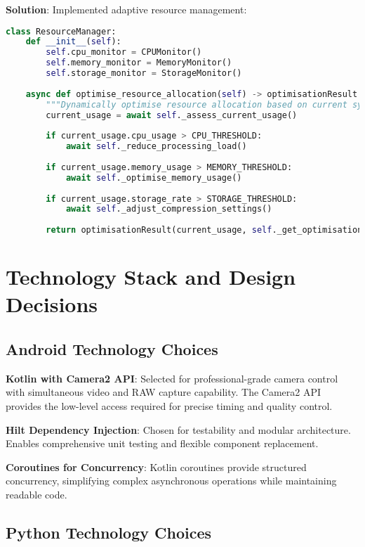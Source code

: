 \documentclass[11pt,a4paper]{report}
\begin{document}
\textbf{Solution}: Implemented adaptive resource management:

\begin{lstlisting}[language=Python]
class ResourceManager:
    def __init__(self):
        self.cpu_monitor = CPUMonitor()
        self.memory_monitor = MemoryMonitor()
        self.storage_monitor = StorageMonitor()
        
    async def optimise_resource_allocation(self) -> optimisationResult:
        """Dynamically optimise resource allocation based on current system state."""
        current_usage = await self._assess_current_usage()
        
        if current_usage.cpu_usage > CPU_THRESHOLD:
            await self._reduce_processing_load()
        
        if current_usage.memory_usage > MEMORY_THRESHOLD:
            await self._optimise_memory_usage()
        
        if current_usage.storage_rate > STORAGE_THRESHOLD:
            await self._adjust_compression_settings()
        
        return optimisationResult(current_usage, self._get_optimisation_actions())
\end{lstlisting}

\section{Technology Stack and Design Decisions}

\subsection{Android Technology Choices}

\textbf{Kotlin with Camera2 API}: Selected for professional-grade camera control with simultaneous video and RAW capture capability. The Camera2 API provides the low-level access required for precise timing and quality control.

\textbf{Hilt Dependency Injection}: Chosen for testability and modular architecture. Enables comprehensive unit testing and flexible component replacement.

\textbf{Coroutines for Concurrency}: Kotlin coroutines provide structured concurrency, simplifying complex asynchronous operations while maintaining readable code.

\subsection{Python Technology Choices}
\end{document}
